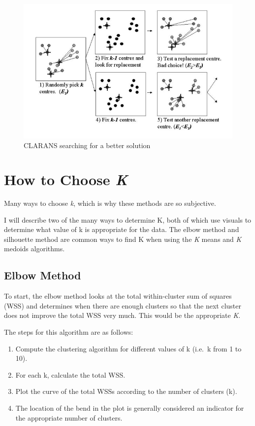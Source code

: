 \documentclass[12pt,twoside]{amherstthesis}
\providecommand{\tightlist}{%
  \setlength{\itemsep}{0pt}\setlength{\parskip}{0pt}}
\begin{document}
  \begin{figure}[htbp]
  \centering
  \includegraphics[scale = 0.5,angle = 0]{clustering_pic.png}
  \caption[CLARANS searching for a better solution]{\normalsize{CLARANS searching for a better solution}}
  \label{fig:CLARANS}
  \end{figure}
  
  \section{\texorpdfstring{How to Choose
  \emph{K}}{How to Choose K}}\label{how-to-choose-k}
  
  Many ways to choose \emph{k}, which is why these methods are so
  subjective.
  
  I will describe two of the many ways to determine K, both of which use
  visuals to determine what value of k is appropriate for the data. The
  elbow method and silhouette method are common ways to find K when using
  the \emph{K} means and \emph{K} medoids algorithms.
  
  \subsection{Elbow Method}\label{elbow-method}
  
  To start, the elbow method looks at the total within-cluster sum of
  squares (WSS) and determines when there are enough clusters so that the
  next cluster does not improve the total WSS very much. This would be the
  appropriate \emph{K}.
  
  The steps for this algorithm are as follows:
  
  \begin{enumerate}
  \def\labelenumi{\arabic{enumi}.}
  \tightlist
  \item
    Compute the clustering algorithm for different values of k (i.e.~k
    from 1 to 10).
  \item
    For each k, calculate the total WSS.
  \item
    Plot the curve of the total WSSs according to the number of clusters
    (k).
  \item
    The location of the bend in the plot is generally considered an
    indicator for the appropriate number of clusters.
  \end{enumerate}
  
\end{document}

